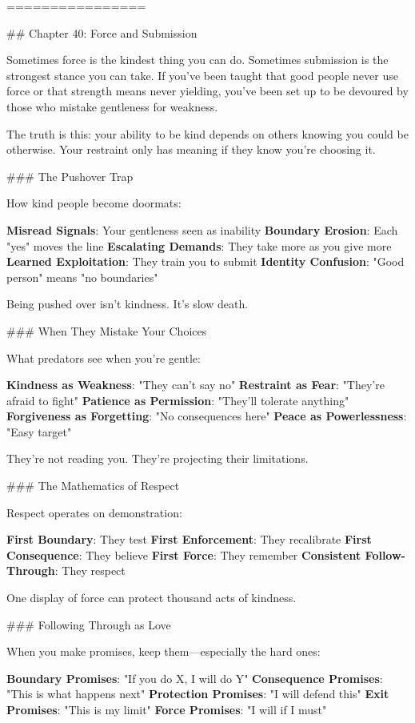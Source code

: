 \documentclass[12pt]{book}
\begin{document}
================

\#\# Chapter 40: Force and Submission

Sometimes force is the kindest thing you can do. Sometimes submission is the strongest stance you can take. If you've been taught that good people never use force or that strength means never yielding, you've been set up to be devoured by those who mistake gentleness for weakness.

The truth is this: your ability to be kind depends on others knowing you could be otherwise. Your restraint only has meaning if they know you're choosing it.

\#\#\# The Pushover Trap

How kind people become doormats:

\textbf{Misread Signals}: Your gentleness seen as inability
\textbf{Boundary Erosion}: Each "yes" moves the line
\textbf{Escalating Demands}: They take more as you give more
\textbf{Learned Exploitation}: They train you to submit
\textbf{Identity Confusion}: "Good person" means "no boundaries"

Being pushed over isn't kindness. It's slow death.

\#\#\# When They Mistake Your Choices

What predators see when you're gentle:

\textbf{Kindness as Weakness}: "They can't say no"
\textbf{Restraint as Fear}: "They're afraid to fight"
\textbf{Patience as Permission}: "They'll tolerate anything"
\textbf{Forgiveness as Forgetting}: "No consequences here"
\textbf{Peace as Powerlessness}: "Easy target"

They're not reading you. They're projecting their limitations.

\#\#\# The Mathematics of Respect

Respect operates on demonstration:

\textbf{First Boundary}: They test
\textbf{First Enforcement}: They recalibrate
\textbf{First Consequence}: They believe
\textbf{First Force}: They remember
\textbf{Consistent Follow-Through}: They respect

One display of force can protect thousand acts of kindness.

\#\#\# Following Through as Love

When you make promises, keep them—especially the hard ones:

\textbf{Boundary Promises}: "If you do X, I will do Y"
\textbf{Consequence Promises}: "This is what happens next"
\textbf{Protection Promises}: "I will defend this"
\textbf{Exit Promises}: "This is my limit"
\textbf{Force Promises}: "I will if I must"
\end{document}
